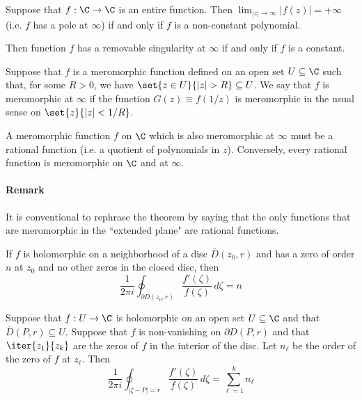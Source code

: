 \label{cabe102}

Suppose that $f:\C\to\C$ is an entire function. Then
$\lim_{|z|\to\infty}|f(z)|=+\infty$ (i.e. $f$ has a pole at $\infty$) if and
only if $f$ is a non-constant polynomial.

Then function $f$ has a removable singularity at $\infty$ if and only if $f$ is
a constant.

\label{e315122}

Suppose that $f$ is a meromorphic function defined on an open set
$U\subseteq\C$ such that, for some $R>0$, we have $\set{z\in U}{|z|>R}\subseteq
U$. We say that $f$ is meromorphic at $\infty$ if the function $G(z)\equiv
f(1/z)$ is meromorphic in the usual sense on $\set{z}{|z|<1/R}$.

\label{d0f6c9d}

A meromorphic function $f$ on $\C$ which is also meromorphic at $\infty$ must
be a rational function (i.e. a quotient of polynomials in $z$). Conversely,
every rational function is meromorphic on $\C$ and at $\infty$.

\paragraph{Remark}

It is conventional to rephrase the theorem by saying that the only functions
that are meromorphic in the ``extended plane" are rational functions.

\label{bfaa6bf}

If $f$ is holomorphic on a neighborhood of a disc $\overline D(z_0,r)$ and has
a zero of order $n$ at $z_0$ and no other zeros in the closed disc, then
$$
  \frac1{2\pi i}\oint_{\partial D(z_0,r)}\frac{f'(\zeta)}{f(\zeta)}\,d\zeta=n
$$


\label{fb7bf08}

Suppose that $f:U\to\C$ is holomorphic on an open set $U\subseteq\C$ and that
$\overline D(P,r)\subseteq U$. Suppose that $f$ is non-vanishing on $\partial
D(P,r)$ and that $\iter{z_1}{z_k}$ are the zeros of $f$ in the interior of the
disc. Let $n_\ell$ be the order of the zero of $f$ at $z_\ell$. Then
$$
  \frac1{2\pi i}\oint_{|\zeta-P|=r}\frac{f'(\zeta)}{f(\zeta)}\,d\zeta=\sum_{\ell=1}^kn_\ell
$$


